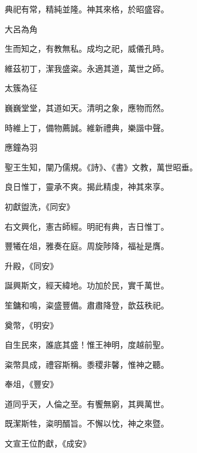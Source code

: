 \begin{pinyinscope}
 典祀有常，精純並隆。神其來格，於昭盛容。



 大呂為角



 生而知之，有教無私。成均之祀，威儀孔時。



 維茲初丁，潔我盛粢。永適其道，萬世之師。



 太簇為征



 巍巍堂堂，其道如天。清明之象，應物而然。



 時維上丁，備物薦誠。維新禮典，樂諧中聲。



 應鐘為羽



 聖王生知，闡乃儒規。《詩》、《書》文教，萬世昭垂。



 良日惟丁，靈承不爽。揭此精虔，神其來享。



 初獻盥洗，《同安》



 右文興化，憲古師經。明祀有典，吉日惟丁。



 豐犧在俎，雅奏在庭。周旋陟降，福祉是膺。



 升殿，《同安》



 誕興斯文，經天緯地。功加於民，實千萬世。



 笙鏞和鳴，粢盛豐備。肅肅降登，歆茲秩祀。



 奠幣，《明安》



 自生民來，誰底其盛！惟王神明，度越前聖。



 粢幣具成，禮容斯稱。黍稷非馨，惟神之聽。



 奉俎，《豐安》



 道同乎天，人倫之至。有饗無窮，其興萬世。



 既潔斯牲，粢明醑旨。不懈以忱，神之來暨。



 文宣王位酌獻，《成安》




\end{pinyinscope}
